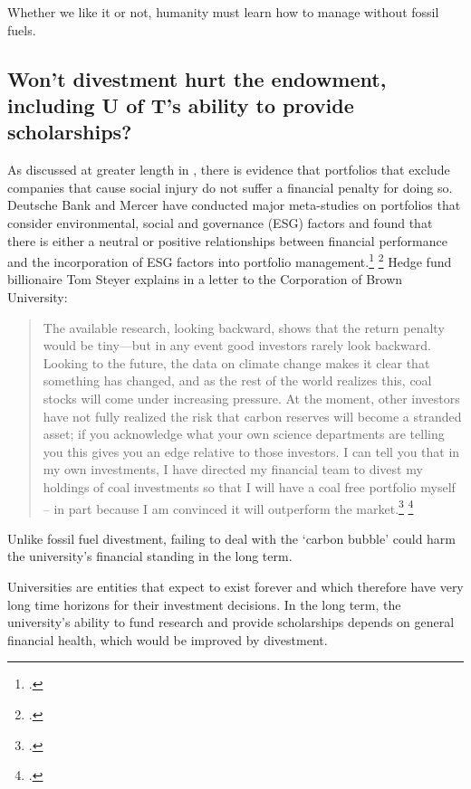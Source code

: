 \documentclass[10pt]{article}
\begin{document}
Whether we like it or not, humanity must learn how to manage without fossil fuels.



	\subsection{Won't divestment hurt the endowment, including U of T's ability to provide scholarships?}
	\label{HurtEndowment}
	
	
	
As discussed at greater length in , there is evidence that portfolios that exclude companies that cause social injury do not suffer a financial penalty for doing so.
Deutsche Bank and Mercer have conducted major meta-studies on portfolios that consider environmental, social and governance (ESG) factors and found that there is either a neutral or positive relationships between financial performance and the incorporation of ESG factors into portfolio management.\footcite{DeutscheBankSI} \footcite{MercerRI}
Hedge fund billionaire Tom Steyer explains in a letter to the Corporation of Brown University:
\begin{quote}
The available research, looking backward, shows that the return penalty would be tiny—but in any event good investors rarely look backward. Looking to the future, the data on climate change makes it clear that something has changed, and as the rest of the world realizes this, coal stocks will come under increasing pressure. At the moment, other investors have not fully realized the risk that carbon reserves will become a stranded asset; if you acknowledge what your own science departments are telling you this gives you an edge relative to those investors. I can tell you that in my own investments, I have directed my financial team to divest my holdings of coal investments so that I will have a coal free portfolio myself – in part because I am convinced it will outperform the market.\footcite[][]{SteyerBrownLetter} \footcite[See also: ][]{SteyerMiddleburyLetter}
\end{quote}
Unlike fossil fuel divestment, failing to deal with the `carbon bubble' could harm the university's financial standing in the long term.



Universities are entities that expect to exist forever and which therefore have very long time horizons for their investment decisions.
In the long term, the university's ability to fund research and provide scholarships depends on general financial health, which would be improved by divestment.
\end{document}

